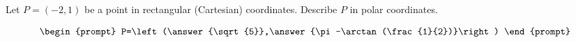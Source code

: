 \documentclass{ximera}
\author{Gregory Hartman \and Matthew Carr}
\begin{document}
\begin{exercise}





Let $P=(-2,1)$ be a point in rectangular (Cartesian) coordinates. Describe $P$ in polar coordinates.

\[
\begin{prompt}
P=\left(\answer{\sqrt{5}},\answer{\pi-\arctan(\frac{1}{2})}\right)
\end{prompt}
\]

\end{exercise}
\end{document}
